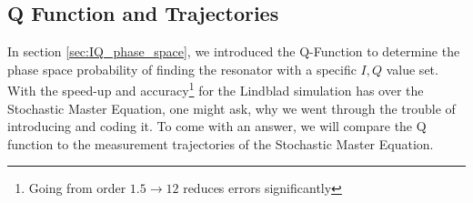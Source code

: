 
\FloatBarrier

\subsection{Q Function and Trajectories}\label{sec:trajectories_and_qfunc}
In section \ref{sec:IQ_phase_space}, we introduced the Q-Function to determine the phase space probability of finding the resonator with a specific $I, Q$ value set. With the speed-up and accuracy\footnote{Going from order $1.5 \rightarrow 12$ reduces errors significantly} for the Lindblad simulation has over the Stochastic Master Equation, one might ask, why we went through the trouble of introducing and coding it. To come with an answer, we will  compare the Q function to the measurement trajectories of the Stochastic Master Equation.

